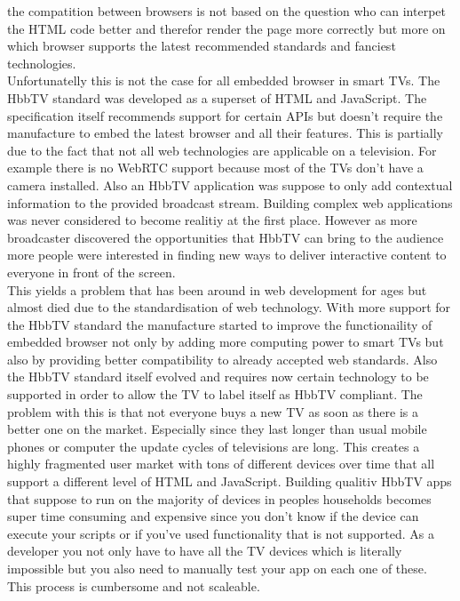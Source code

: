 the compatition between browsers is not based on the question who can interpet the HTML code better and therefor
render the page more correctly but more on which browser supports the latest recommended standards and fanciest
technologies.\\
Unfortunatelly this is not the case for all embedded browser in smart TVs. The HbbTV standard was developed as
a superset of HTML and JavaScript. The specification itself recommends support for certain APIs but doesn't
require the manufacture to embed the latest browser and all their features. This is partially due to the fact
that not all web technologies are applicable on a television. For example there is no WebRTC support because
most of the TVs don't have a camera installed. Also an HbbTV application was suppose to only add contextual
information to the provided broadcast stream. Building complex web applications was never considered to become
realitiy at the first place. However as more broadcaster discovered the opportunities that HbbTV can bring to
the audience more people were interested in finding new ways to deliver interactive content to everyone in
front of the screen.\\
This yields a problem that has been around in web development for ages but almost died due to the standardisation
of web technology. With more support for the HbbTV standard the manufacture started to improve the functionaility
of embedded browser not only by adding more computing power to smart TVs but also by providing better compatibility
to already accepted web standards. Also the HbbTV standard itself evolved and requires now certain technology to be
supported in order to allow the TV to label itself as HbbTV compliant. The problem with this is that not everyone
buys a new TV as soon as there is a better one on the market. Especially since they last longer than usual mobile
phones or computer the update cycles of televisions are long. This creates a highly fragmented user market with
tons of different devices over time that all support a different level of HTML and JavaScript. Building qualitiv
HbbTV apps that suppose to run on the majority of devices in peoples households becomes super time consuming
and expensive since you don't know if the device can execute your scripts or if you've used functionality that
is not supported. As a developer you not only have to have all the TV devices which is literally impossible but you
also need to manually test your app on each one of these. This process is cumbersome and not scaleable.


